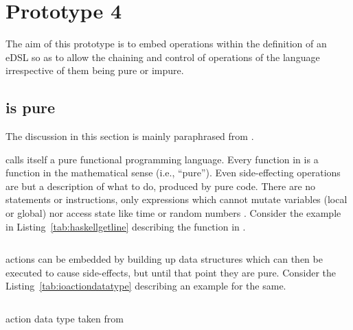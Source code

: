 \documentclass[thesis-solanki.tex]{subfiles}
\begin{document}
\chapter{Prototype 4}{\label{proto4}}

The aim of this prototype is to embed  operations within the definition of an eDSL so as to
allow the chaining and control of operations of the language irrespective of them being pure or impure.

\section{  is pure}

The discussion in this section is mainly paraphrased from \cite{website:ioispurechristaylor}.

 calls itself a pure functional programming language.
Every function in  is a function in the mathematical sense (i.e., ``pure'').
Even side-effecting  operations are but a description of what to do, produced by pure code.
There are no statements or instructions, only expressions which cannot mutate variables (local or global) nor
access state like time or random numbers \cite{website:haskellorg}.
Consider the example in Listing~\ref{tab:haskellgetline} describing the  function in
.

\begin{code-list}[H]
\begin{singlespace}
\inputminted{haskell}{haskell-proto4-haskell-getLine.hs}
\end{singlespace}
\caption{ }
\label{tab:haskellgetline}
\end{code-list}

 actions can be embedded by building up data structures which can then be executed to cause
side-effects, but until that point they are pure.
Consider the Listing~\ref{tab:ioactiondatatype} describing an example for the same.

\begin{code-list}[H]
\begin{singlespace}
\inputminted{haskell}{haskell-proto4-ioaction-datatype.hs}
\end{singlespace}
\caption{ action data type taken from \cite{website:ioispurechristaylor}}
\label{tab:ioactiondatatype}
\end{code-list}
\end{document}
